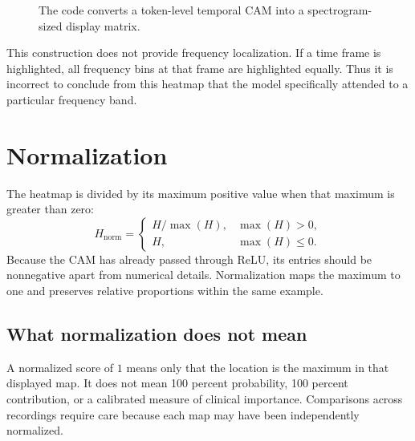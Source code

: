 \documentclass[11pt,a4paper]{article}
\begin{document}
\begin{figure}[H]
\centering
{}
\caption{The code converts a token-level temporal CAM into a spectrogram-sized display matrix.}
\end{figure}

This construction does not provide frequency localization. If a time frame is highlighted, all frequency bins at that frame are highlighted equally. Thus it is incorrect to conclude from this heatmap that the model specifically attended to a particular frequency band.

\section{Normalization}
The heatmap is divided by its maximum positive value when that maximum is greater than zero:
\[
H_{\mathrm{norm}}=
\begin{cases}
H/\max(H), & \max(H)>0,\\
H, & \max(H)\leq 0.
\end{cases}
\]
Because the CAM has already passed through ReLU, its entries should be nonnegative apart from numerical details. Normalization maps the maximum to one and preserves relative proportions within the same example.

\subsection{What normalization does not mean}
A normalized score of $1$ means only that the location is the maximum in that displayed map. It does not mean 100 percent probability, 100 percent contribution, or a calibrated measure of clinical importance. Comparisons across recordings require care because each map may have been independently normalized.
\end{document}
